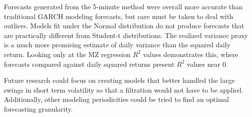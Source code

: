\documentclass[10pt,twoside,printwatermark=false]{pinp}
\begin{document}
Forecasts generated from the 5-minute method were overall more accurate
than traditional GARCH modeling forecasts, but care must be taken to
deal with outliers. Models fit under the Normal distribution do not
produce forecasts that are practically different from Student-t
distributions. The realized variance proxy is a much more promising
estimate of daily variance than the squared daily return. Looking only
at the MZ regression \(R^2\) values demonstrates this, where forecasts
compared against daily squared returns present \(R^2\) values near 0.

Future research could focus on creating models that better handled the
large swings in short term volatility so that a filtration would not
have to be applied. Additionally, other modeling periodicities could be
tried to find an optimal forecasting granularity.

\showacknow




\end{document}
